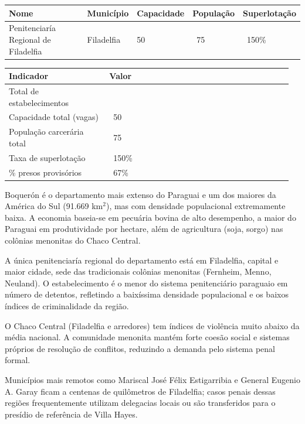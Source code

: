 {\small
\setlength{\tabcolsep}{3pt}
\renewcommand{\arraystretch}{1.12}
{\small
\begin{tabularx}{\linewidth}{lXXXX}
\toprule
Nome & Município & Capacidade & População & Superlotação \\
\midrule
Penitenciaría Regional de Filadelfia & Filadelfia & 50 & ~75 & ~150\% \\
\bottomrule
\end{tabularx}
}
}


{\small
\setlength{\tabcolsep}{3pt}
\renewcommand{\arraystretch}{1.12}
\begin{tabularx}{\linewidth}{>{\raggedright\arraybackslash}p{0.34\linewidth} >{\raggedright\arraybackslash}p{0.62\linewidth}}
\toprule
Indicador & Valor \\
\midrule
Total de estabelecimentos & 1 \\
Capacidade total (vagas) & ~50 \\
População carcerária total & ~75 \\
Taxa de superlotação & ~150\% \\
\% presos provisórios & ~67\% \\
\bottomrule
\end{tabularx}
}


Boquerón é o departamento mais extenso do Paraguai e um dos maiores da América do Sul (91.669 km$^2$), mas com densidade populacional extremamente baixa. A economia baseia-se em pecuária bovina de alto desempenho, a maior do Paraguai em produtividade por hectare, além de agricultura (soja, sorgo) nas colônias menonitas do Chaco Central.

A única penitenciaría regional do departamento está em Filadelfia, capital e maior cidade, sede das tradicionais colônias menonitas (Fernheim, Menno, Neuland). O estabelecimento é o menor do sistema penitenciário paraguaio em número de detentos, refletindo a baixíssima densidade populacional e os baixos índices de criminalidade da região.

O Chaco Central (Filadelfia e arredores) tem índices de violência muito abaixo da média nacional. A comunidade menonita mantém forte coesão social e sistemas próprios de resolução de conflitos, reduzindo a demanda pelo sistema penal formal.

Municípios mais remotos como Mariscal José Félix Estigarribia e General Eugenio A. Garay ficam a centenas de quilômetros de Filadelfia; casos penais dessas regiões frequentemente utilizam delegacias locais ou são transferidos para o presídio de referência de Villa Hayes.

